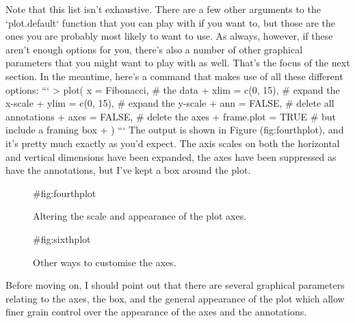 Note that this list isn't exhaustive. There are a few other arguments to the `plot.default` function that you can play with if you want to, but those are the ones you are probably most likely to want to use. As always, however, if these aren't enough options for you, there's also a number of other graphical parameters that you might want to play with as well. That's the focus of the next section. In the meantime, here's a command that makes use of all these different options:
```
> plot( x = Fibonacci,       # the data
+       xlim = c(0, 15),     # expand the x-scale
+       ylim = c(0, 15),     # expand the y-scale
+       ann = FALSE,         # delete all annotations
+       axes = FALSE,        # delete the axes
+       frame.plot = TRUE    # but include a framing box
+ )
```
The output is shown in Figure \@ref(fig:fourthplot), and it's pretty much exactly as you'd expect. The axis scales on both the horizontal and vertical dimensions have been expanded, the axes have been suppressed as have the annotations, but I've kept a box around the plot.

\begin{figure}[p]
\begin{center}
\caption{Altering the scale and appearance of the plot axes.}
\HR
{#fig:fourthplot}
\end{center}
\end{figure}
\begin{figure}[p]
\begin{center}
\caption{Other ways to customise the axes.}
\HR
{#fig:sixthplot}
\end{center}
\end{figure}

Before moving on, I should point out that there are several graphical parameters relating to the axes, the box, and the general appearance of the plot which allow finer grain control over the appearance of the axes and the annotations. 

